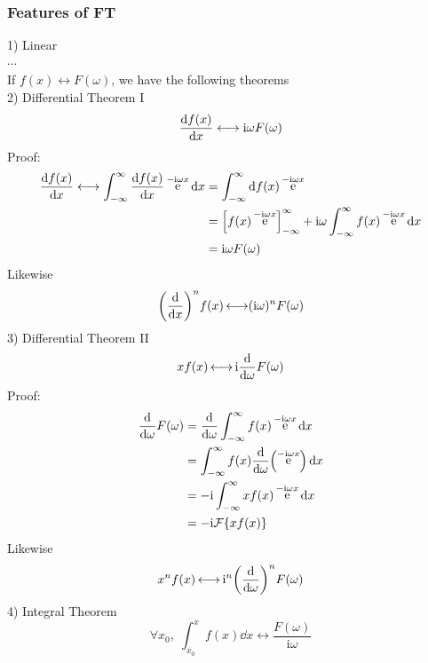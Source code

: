 \documentclass[UTF8]{ctexart} %
\DeclareMathOperator{\intdinf}{\int_{-\infty}^\infty}
\DeclareMathOperator{\e}{\mathrm{e}}
\renewcommand{\I}{\mathrm{i}}
\DeclareMathOperator{\llra}{\longleftrightarrow}
\numberwithin{equation}{section}
\begin{document}
\subsubsection{Features of FT}
1) Linear\\
$\cdots$\\
If $f(x)\llra F(\omega)$, we have the following theorems\\
2) Differential Theorem I\\
\begin{equation}\label{key}
\dv{f(x)}{x}\longleftrightarrow \I\omega F(\omega)
\end{equation}
Proof:\\
\begin{equation}\label{key}
\begin{aligned}
\dv{f(x)}{x}\longleftrightarrow\intdinf\dv{f(x)}{x}\e^{-\I\omega x}\dd x
&=\intdinf \dd f(x) \e^{-\I\omega x}\\
&=\left[f(x)\e^{-\I\omega x}\right]_{-\infty}^\infty + \I\omega\intdinf f(x) \e^{-\I\omega x}\dd x\\
&=\I\omega F(\omega)
\end{aligned}
\end{equation}
Likewise
\begin{equation}\label{key}
\qty(\dv{x})^n f(x)\llra (\I\omega)^n F(\omega)
\end{equation}
3) Differential Theorem II\\
\begin{equation}\label{key}
x f(x)\llra \I\dv{\omega}F(\omega)
\end{equation}
Proof:\\
\begin{equation}\label{key}
\begin{aligned}
\dv{\omega}F(\omega) &=\dv{\omega}\intdinf f(x)\e^{-\I\omega x}\dd{x}\\
&=\intdinf f(x)\dv{\omega}(\e^{-\I\omega x})\dd{x}\\
&=-\I\intdinf xf(x)\e^{-\I\omega x}\dd{x}\\
&=-\I\mathcal{F}\{xf(x)\}
\end{aligned}
\end{equation}
Likewise
\begin{equation}\label{key}
x^n f(x)\llra \I^n \qty(\dv{\omega})^n F(\omega)
\end{equation}
4) Integral Theorem\\
\begin{equation}\label{key}
\forall x_0,\; \int_{x_0}^x f(x)\dd{x}\llra\dfrac{F(\omega)}{\I\omega}
\end{equation}
\end{document}
